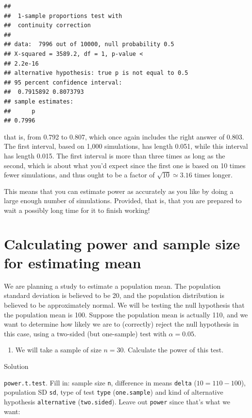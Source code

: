 \documentclass[]{tufte-book}
\providecommand{\tightlist}{%
  \setlength{\itemsep}{0pt}\setlength{\parskip}{0pt}}
\theoremstyle{definition}
\theoremstyle{definition}
\theoremstyle{definition}
\theoremstyle{remark}
\begin{document}
\begin{verbatim}
## 
##  1-sample proportions test with
##  continuity correction
## 
## data:  7996 out of 10000, null probability 0.5
## X-squared = 3589.2, df = 1, p-value <
## 2.2e-16
## alternative hypothesis: true p is not equal to 0.5
## 95 percent confidence interval:
##  0.7915892 0.8073793
## sample estimates:
##      p 
## 0.7996
\end{verbatim}

that is, from 0.792 to 0.807, which once again includes the right answer
of 0.803. The first interval, based on 1,000 simulations, has length
0.051, while this interval has length 0.015. The first interval is more
than three times as long as the second, which is about what you'd expect
since the first one is based on 10 times fewer simulations, and thus
ought to be a factor of \(\sqrt{10}\simeq 3.16\) times longer.

This means that you can estimate power as accurately as you like by
doing a large enough number of simulations. Provided, that is, that you
are prepared to wait a possibly long time for it to finish working!

\hypertarget{calculating-power-and-sample-size-for-estimating-mean}{%
\section{Calculating power and sample size for estimating
mean}\label{calculating-power-and-sample-size-for-estimating-mean}}

We are planning a study to estimate a population mean. The population
standard deviation is believed to be 20, and the population distribution
is believed to be approximately normal. We will be testing the null
hypothesis that the population mean is 100. Suppose the population mean
is actually 110, and we want to determine how likely we are to
(correctly) reject the null hypothesis in this case, using a two-sided
(but one-sample) test with \(\alpha=0.05\).

\begin{enumerate}
\def\labelenumi{(\alph{enumi})}
\tightlist
\item
  We will take a sample of size \(n=30\). Calculate the power of this
  test.
\end{enumerate}

Solution

\texttt{power.t.test}. Fill in: sample size \texttt{n}, difference in
means \texttt{delta} (\(10=110-100\)), population SD \texttt{sd}, type
of test \texttt{type} (\texttt{one.sample}) and kind of alternative
hypothesis \texttt{alternative} (\texttt{two.sided}). Leave out
\texttt{power} since that's what we want:
\end{document}
